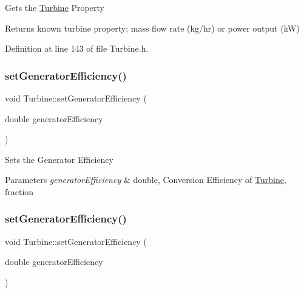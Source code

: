 Gets the \hyperlink{class_turbine}{Turbine} Property

\begin{DoxyReturn}{Returns}
known turbine property\+: mass flow rate (kg/hr) or power output (kW) 
\end{DoxyReturn}


Definition at line 143 of file Turbine.\+h.

\mbox{\label{class_turbine_a51e9c5050a5be51b86dc23e690bd3f40}} 
\subsubsection{\texorpdfstring{set\+Generator\+Efficiency()}{setGeneratorEfficiency()}\hspace{0.1cm}{\footnotesize\ttfamily [1/3]}}
{\footnotesize\ttfamily void Turbine\+::set\+Generator\+Efficiency (\begin{DoxyParamCaption}\item[{double}]{generator\+Efficiency }\end{DoxyParamCaption})}

Sets the Generator Efficiency


\begin{DoxyParams}{Parameters}
{\em generator\+Efficiency} & double, Conversion Efficiency of \hyperlink{class_turbine}{Turbine}, fraction \\
\hline
\end{DoxyParams}
\mbox{\label{class_turbine_a51e9c5050a5be51b86dc23e690bd3f40}} 
\subsubsection{\texorpdfstring{set\+Generator\+Efficiency()}{setGeneratorEfficiency()}\hspace{0.1cm}{\footnotesize\ttfamily [2/3]}}
{\footnotesize\ttfamily void Turbine\+::set\+Generator\+Efficiency (\begin{DoxyParamCaption}\item[{double}]{generator\+Efficiency }\end{DoxyParamCaption})}

